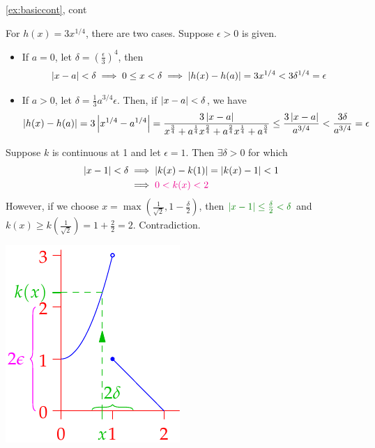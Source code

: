 \begin{examples*}{\ref{ex:basiccont}, cont}{}
\begin{enumerate}
	  \item For $h(x)=3x^{1/4}$, there are two cases. Suppose $\epsilon>0$ is given.
	  \begin{itemize}
	    \item If $a=0$, let $\delta=\left(\frac\epsilon 3\right)^4$, then\footnotemark{}
	  	\begin{align*}
	  		\left| x-a\right|<\delta\implies 0\le x<\delta\implies \left| h(x)-h(a)\right|=3x^{1/4}<3\delta^{1/4}=\epsilon
	  	\end{align*}
	    \item If $a>0$, let $\delta=\frac 13a^{3/4}\epsilon$. Then, if $\left| x-a\right|<\delta$, we have
	    \[
	    	\left| h(x)-h(a)\right|=3\left| x^{1/4}-a^{1/4}\right|=\frac{3\left| x-a\right|}{x^{\frac 34}+a^{\frac 14}x^{\frac 24}+a^{\frac 24}x^{\frac 14}+a^{\frac 34}} \le\frac{3\left| x-a\right|}{a^{3/4}}<\frac{3\delta}{a^{3/4}} =\epsilon
	    \]
	  \end{itemize}
    
  	\begin{minipage}[t]{0.7\linewidth}\vspace{0pt}
	  	\item Suppose $k$ is continuous at 1 and let $\epsilon=1$. Then $\exists \delta>0$ for which
	  	\begin{align*}
			  \left| x-1\right|<\delta&\implies \left| k(x)-k(1)\right|=\left| k(x)-1\right|<1\\
			  &\implies \textcolor{magenta}{0<k(x)<2}
		  \end{align*}
	  	However, if we choose $x=\max(\frac 1{\sqrt 2},1-\frac\delta 2)$, then $\textcolor{Green}{\nm{x-1}\le \frac\delta 2<\delta}$ and $k(x)\ge k(\frac 1{\sqrt 2})=1+\frac 22=2$. Contradiction.
	  \end{minipage}
	  \hfill
	  \begin{minipage}[t]{0.27\linewidth}\vspace{-2pt}
	  	\flushright\includegraphics[scale=0.9]{cont-ex3}
	  \end{minipage}
	  
  \end{enumerate}
  
\end{examples*}

